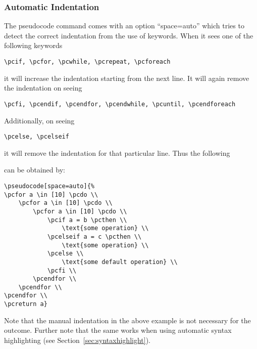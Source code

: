 \documentclass[a4paper]{report}
\begin{document}
\subsubsection{Automatic Indentation}
The pseudocode command comes with an option \enquote{space=auto} which tries to detect the correct indentation from the use of
keywords. When it sees one of the following keywords
\begin{lstlisting}
\pcif, \pcfor, \pcwhile, \pcrepeat, \pcforeach
\end{lstlisting}
it will increase the indentation starting from the next line. It will again remove the indentation on seeing
\begin{lstlisting}
\pcfi, \pcendif, \pcendfor, \pcendwhile, \pcuntil, \pcendforeach
\end{lstlisting}
Additionally, on seeing
\begin{lstlisting}
\pcelse, \pcelseif
\end{lstlisting}
it will remove the indentation for that particular line. Thus the following
\begin{center}
\end{center}
can be obtained by:
\begin{lstlisting}
\pseudocode[space=auto]{%
\pcfor a \in [10] \pcdo \\
	\pcfor a \in [10] \pcdo \\
		\pcfor a \in [10] \pcdo \\
			\pcif a = b \pcthen \\
				\text{some operation} \\
			\pcelseif a = c \pcthen \\
				\text{some operation} \\
			\pcelse \\
				\text{some default operation} \\
			\pcfi \\
		\pcendfor \\
	\pcendfor \\
\pcendfor \\
\pcreturn a}
\end{lstlisting}
Note that the manual indentation in the above example is not necessary for the outcome. Further note that the same
works when using automatic syntax highlighting (see Section~\ref{sec:syntaxhighlight}).
\end{document}
